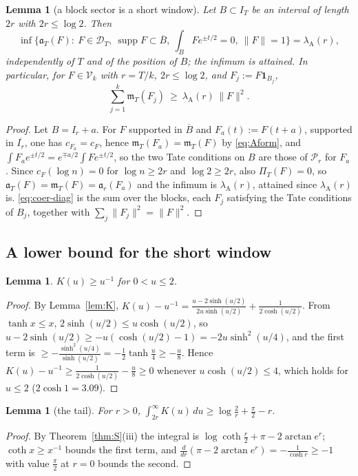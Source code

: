 \documentclass[11pt]{amsart}
\newtheorem{lemma}[theorem]{Lemma}
\theoremstyle{definition}
\theoremstyle{remark}
\newcommand{\supp}{\operatorname{supp}}
\newcommand{\IT}{I_T}
\newcommand{\cF}{c_F}
\newcommand{\PiT}{\Pi_T}
\newcommand{\mT}{\mathfrak m_T}
\begin{document}
\begin{lemma}[a block sector is a short window]\label{lem:coer-sector}
Let $B\subset\IT$ be an interval of length $2r$ with $2r\le\log2$. Then
\[
\inf\Big\{\mathfrak a_T(F):\ F\in\mathcal D_T,\ \supp F\subset\overline B,\ \int_BFe^{\pm t/2}=0,\ \|F\|=1\Big\}=\lambda_{\mathrm A}(r),
\]
independently of $T$ and of the position of $B$; the infimum is attained. In particular, for $F\in\mathcal V_k$ with
$r=T/k$, $2r\le\log2$, and $F_j:=F\mathbf 1_{B_j}$,
\begin{equation}\label{eq:coer-diag}
\sum_{j=1}^k\mT(F_j)\ \ge\ \lambda_{\mathrm A}(r)\,\|F\|^2 .
\end{equation}
\end{lemma}
\begin{proof}
Let $B=I_r+a$. For $F$ supported in $\overline B$ and $F_a(t):=F(t+a)$, supported in $\overline{I_r}$, one has $c_{F_a}=\cF$,
hence $\mT(F_a)=\mT(F)$ by \eqref{eq:Aform}, and $\int F_ae^{\pm t/2}=e^{\mp a/2}\int Fe^{\pm t/2}$, so the two Tate
conditions on $B$ are those of $\mathcal P_r$ for $F_a$. Since $\cF(\log n)=0$ for $\log n\ge2r$ and $\log2\ge2r$, also
$\PiT(F)=0$, so $\mathfrak a_T(F)=\mT(F)=\mathfrak a_r(F_a)$ and the infimum is $\lambda_{\mathrm A}(r)$, attained since
$\lambda_{\mathrm A}(r)$ is. \eqref{eq:coer-diag} is the sum over the blocks, each $F_j$ satisfying the Tate conditions of
$B_j$, together with $\sum_j\|F_j\|^2=\|F\|^2$.
\end{proof}


\subsection{A lower bound for the short window}\label{subsec:coer-short}

\begin{lemma}\label{lem:coer-K}
$K(u)\ge u^{-1}$ for $0<u\le2$.
\end{lemma}
\begin{proof}
By Lemma~\ref{lem:K}, $K(u)-u^{-1}=\frac{u-2\sinh(u/2)}{2u\sinh(u/2)}+\frac1{2\cosh(u/2)}$. From $\tanh x\le x$,
$2\sinh(u/2)\le u\cosh(u/2)$, so $u-2\sinh(u/2)\ge-u(\cosh(u/2)-1)=-2u\sinh^2(u/4)$, and the first term is
$\ge-\frac{\sinh^2(u/4)}{\sinh(u/2)}=-\frac12\tanh\frac u4\ge-\frac u8$. Hence $K(u)-u^{-1}\ge\frac1{2\cosh(u/2)}-\frac u8\ge0$
whenever $u\cosh(u/2)\le4$, which holds for $u\le2$ ($2\cosh1=3.09$).
\end{proof}

\begin{lemma}[the tail]\label{lem:coer-tail}
For $r>0$, $\int_{2r}^\infty K(u)\,du\ge\log\frac2r+\frac\pi2-r$.
\end{lemma}
\begin{proof}
By Theorem~\ref{thm:S}(iii) the integral is $\log\coth\frac r2+\pi-2\arctan e^r$; $\coth x\ge x^{-1}$ bounds the first
term, and $\frac{d}{dr}(\pi-2\arctan e^r)=-\frac1{\cosh r}\ge-1$ with value $\frac\pi2$ at $r=0$ bounds the second.
\end{proof}
\end{document}
